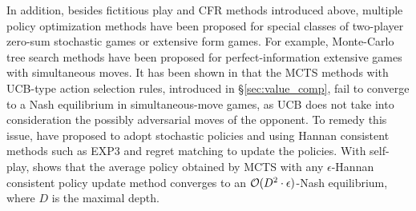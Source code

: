   
  
  In addition, besides   fictitious play and CFR methods introduced above,  multiple policy optimization methods have been  proposed for special classes of two-player zero-sum stochastic games  or extensive form games. For example, Monte-Carlo tree search methods
   have been  proposed  for perfect-information extensive games with simultaneous moves. 
It has been shown in \cite{schaeffer2009comparing} that  the MCTS  methods with UCB-type action selection rules, introduced in \S\ref{sec:value_comp}, fail to converge to a Nash equilibrium in simultaneous-move games, as UCB does not take into consideration the possibly adversarial moves of the opponent. 
To remedy this issue, 
   \cite{lanctot2013monte,lisy2013convergence, tak2014monte, kovavrik2018analysis} 
 have proposed to adopt stochastic policies and using  Hannan consistent methods such as EXP3   \cite{auer2002nonstochastic} and regret matching \cite{hart2000simple} to update the policies. With self-play, \cite{lisy2013convergence} shows that the average policy obtained by MCTS with any $\epsilon$-Hannan consistent policy update method  converges to an $\mathcal{O}(D^2 \cdot \epsilon)$-Nash equilibrium, where $D$ is the maximal depth.  
 
